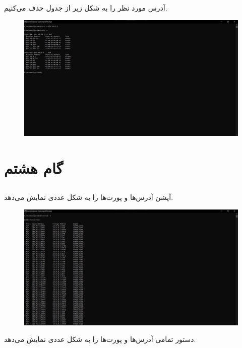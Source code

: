 \documentclass{article}
\begin{document}
\subsection{}
آدرس مورد نظر را به شکل زیر از جدول حذف می‌کنیم.
\begin{figure}[H]
    \centering
    \includegraphics[width=1.0\textwidth]{figures/7.4.jpg}
    \caption
	{
	}
    \label{fig:fig1}
\end{figure}

\section{گام هشتم}
\subsection{}
آپشن  آدرس‌ها و پورت‌ها را به شکل عددی نمایش می‌دهد.
\begin{figure}[H]
    \centering
    \includegraphics[width=1.0\textwidth]{figures/8.1.jpg}
    \caption
	{
	}
    \label{fig:fig1}
\end{figure}
دستور  تمامی آدرس‌ها و پورت‌ها را به شکل عددی نمایش می‌دهد.
\end{document}
